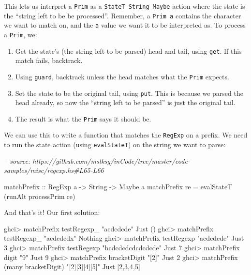 \documentclass[]{article}
\newenvironment{Shaded}{}{}
\newcommand{\CommentTok}[1]{\textcolor[rgb]{0.38,0.63,0.69}{\textit{#1}}}
\newcommand{\DataTypeTok}[1]{\textcolor[rgb]{0.56,0.13,0.00}{#1}}
\newcommand{\DecValTok}[1]{\textcolor[rgb]{0.25,0.63,0.44}{#1}}
\newcommand{\FunctionTok}[1]{\textcolor[rgb]{0.02,0.16,0.49}{#1}}
\newcommand{\NormalTok}[1]{#1}
\newcommand{\OtherTok}[1]{\textcolor[rgb]{0.00,0.44,0.13}{#1}}
\newcommand{\StringTok}[1]{\textcolor[rgb]{0.25,0.44,0.63}{#1}}
\begin{document}
This lets us interpret a \texttt{Prim} as a \texttt{StateT\ String\ Maybe}
action where the state is the ``string left to be be processed''. Remember, a
\texttt{Prim\ a} contains the character we want to match on, and the \texttt{a}
value we want it to be interpreted as. To process a \texttt{Prim}, we:

\begin{enumerate}
\def\labelenumi{\arabic{enumi}.}
\tightlist
\item
  Get the state's (the string left to be parsed) head and tail, using
  \texttt{get}. If this match fails, backtrack.
\item
  Using \texttt{guard}, backtrack unless the head matches what the \texttt{Prim}
  expects.
\item
  Set the state to be the original tail, using \texttt{put}. This is because we
  parsed the head already, so now the ``string left to be parsed'' is just the
  original tail.
\item
  The result is what the \texttt{Prim} says it should be.
\end{enumerate}

We can use this to write a function that matches the \texttt{RegExp} on a
prefix. We need to run the state action (using \texttt{evalStateT}) on the
string we want to parse:

\begin{Shaded}
\begin{Highlighting}[]
\CommentTok{-- source: https://github.com/mstksg/inCode/tree/master/code-samples/misc/regexp.hs#L65-L66}

\OtherTok{matchPrefix ::} \DataTypeTok{RegExp}\NormalTok{ a }\OtherTok{->} \DataTypeTok{String} \OtherTok{->} \DataTypeTok{Maybe}\NormalTok{ a}
\NormalTok{matchPrefix re }\FunctionTok{=}\NormalTok{ evalStateT (runAlt processPrim re)}
\end{Highlighting}
\end{Shaded}

And that's it! Our first solution:

\begin{Shaded}
\begin{Highlighting}[]
\NormalTok{ghci}\FunctionTok{>}\NormalTok{ matchPrefix testRegexp_ }\StringTok{"acdcdcde"}
\DataTypeTok{Just}\NormalTok{ ()}
\NormalTok{ghci}\FunctionTok{>}\NormalTok{ matchPrefix testRegexp_ }\StringTok{"acdcdcdx"}
\DataTypeTok{Nothing}
\NormalTok{ghci}\FunctionTok{>}\NormalTok{ matchPrefix testRegexp }\StringTok{"acdcdcde"}
\DataTypeTok{Just} \DecValTok{3}
\NormalTok{ghci}\FunctionTok{>}\NormalTok{ matchPrefix testRegexp }\StringTok{"bcdcdcdcdcdcdcde"}
\DataTypeTok{Just} \DecValTok{7}
\NormalTok{ghci}\FunctionTok{>}\NormalTok{ matchPrefix digit }\StringTok{"9"}
\DataTypeTok{Just} \DecValTok{9}
\NormalTok{ghci}\FunctionTok{>}\NormalTok{ matchPrefix bracketDigit }\StringTok{"[2]"}
\DataTypeTok{Just} \DecValTok{2}
\NormalTok{ghci}\FunctionTok{>}\NormalTok{ matchPrefix (many bracketDigit) }\StringTok{"[2][3][4][5]"}
\DataTypeTok{Just}\NormalTok{ [}\DecValTok{2}\NormalTok{,}\DecValTok{3}\NormalTok{,}\DecValTok{4}\NormalTok{,}\DecValTok{5}\NormalTok{]}
\end{Highlighting}
\end{Shaded}
\end{document}
